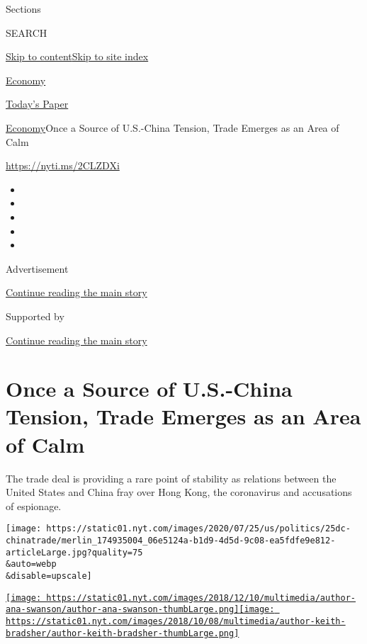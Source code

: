 Sections

SEARCH

\protect\hyperlink{site-content}{Skip to
content}\protect\hyperlink{site-index}{Skip to site index}

\href{https://www.nytimes.com/section/business/economy}{Economy}

\href{https://myaccount.nytimes.com/auth/login?response_type=cookie\&client_id=vi}{}

\href{https://www.nytimes.com/section/todayspaper}{Today's Paper}

\href{/section/business/economy}{Economy}\textbar{}Once a Source of
U.S.-China Tension, Trade Emerges as an Area of Calm

\url{https://nyti.ms/2CLZDXi}

\begin{itemize}
\item
\item
\item
\item
\item
\end{itemize}

Advertisement

\protect\hyperlink{after-top}{Continue reading the main story}

Supported by

\protect\hyperlink{after-sponsor}{Continue reading the main story}

\hypertarget{once-a-source-of-us-china-tension-trade-emerges-as-an-area-of-calm}{%
\section{Once a Source of U.S.-China Tension, Trade Emerges as an Area
of
Calm}\label{once-a-source-of-us-china-tension-trade-emerges-as-an-area-of-calm}}

The trade deal is providing a rare point of stability as relations
between the United States and China fray over Hong Kong, the coronavirus
and accusations of espionage.

\texttt{[image: https://static01.nyt.com/images/2020/07/25/us/politics/25dc-chinatrade/merlin\_174935004\_06e5124a-b1d9-4d5d-9c08-ea5fdfe9e812-articleLarge.jpg?quality=75\\\&auto=webp\\\&disable=upscale]}

\href{https://www.nytimes.com/by/ana-swanson}{\texttt{[image: https://static01.nyt.com/images/2018/12/10/multimedia/author-ana-swanson/author-ana-swanson-thumbLarge.png]}}\href{https://www.nytimes.com/by/keith-bradsher}{\texttt{[image: https://static01.nyt.com/images/2018/10/08/multimedia/author-keith-bradsher/author-keith-bradsher-thumbLarge.png]}}

